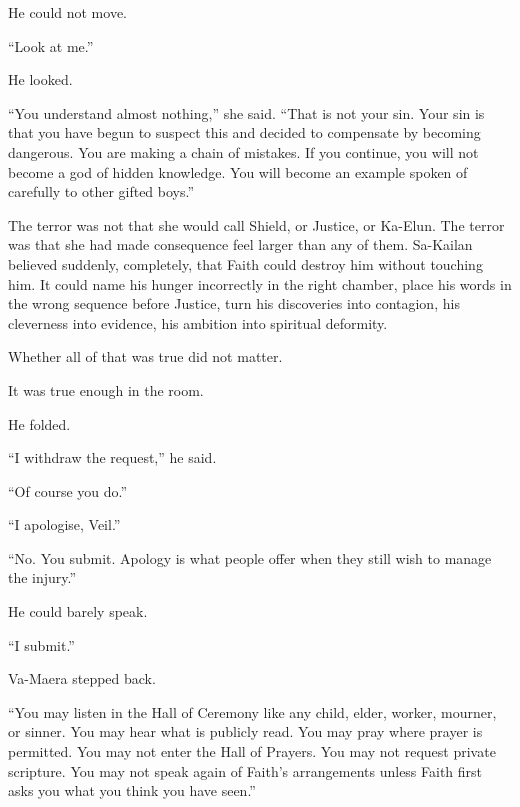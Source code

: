 He could not move.\par

“Look at me.”\par

He looked.\par

“You understand almost nothing,” she said. “That is not your sin. Your sin is that you have begun to suspect this and decided to compensate by becoming dangerous. You are making a chain of mistakes. If you continue, you will not become a god of hidden knowledge. You will become an example spoken of carefully to other gifted boys.”\par

The terror was not that she would call Shield, or Justice, or Ka-Elun. The terror was that she had made consequence feel larger than any of them. Sa-Kailan believed suddenly, completely, that Faith could destroy him without touching him. It could name his hunger incorrectly in the right chamber, place his words in the wrong sequence before Justice, turn his discoveries into contagion, his cleverness into evidence, his ambition into spiritual deformity.\par

Whether all of that was true did not matter.\par

It was true enough in the room.\par

He folded.\par

“I withdraw the request,” he said.\par

“Of course you do.”\par

“I apologise, Veil.”\par

“No. You submit. Apology is what people offer when they still wish to manage the injury.”\par

He could barely speak.\par

“I submit.”\par

Va-Maera stepped back.\par

“You may listen in the Hall of Ceremony like any child, elder, worker, mourner, or sinner. You may hear what is publicly read. You may pray where prayer is permitted. You may not enter the Hall of Prayers. You may not request private scripture. You may not speak again of Faith’s arrangements unless Faith first asks you what you think you have seen.”\par

